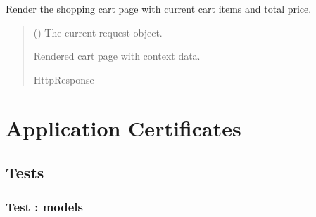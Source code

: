 \documentclass[letterpaper,10pt,english]{sphinxmanual}
\begin{document}
\begin{fulllineitems}
\label{\detokenize{cart:cart.views.view_cart}}
\pysigstartsignatures
\pysiglinewithargsret
{}
{}
{}
\pysigstopsignatures
\sphinxAtStartPar
Render the shopping cart page with current cart items and total price.
\begin{quote}\begin{description}
\sphinxAtStartPar
{} () \textendash{} The current request object.

\sphinxAtStartPar
Rendered cart page with context data.

\sphinxAtStartPar
HttpResponse

\end{description}\end{quote}

\end{fulllineitems}


\sphinxstepscope


\chapter{Application Certificates}
\label{\detokenize{certificates:application-certificates}}\label{\detokenize{certificates::doc}}

\section{Tests}
\label{\detokenize{certificates:tests}}
\sphinxstepscope


\subsection{Test : models}
\label{\detokenize{certificates.tests:module-certificates.tests.test_models}}\label{\detokenize{certificates.tests:test-models}}\label{\detokenize{certificates.tests::doc}}
\end{document}
